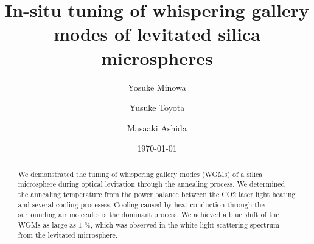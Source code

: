 \documentclass[aps,prl,preprint,groupedaddress]{revtex4-1}
\begin{document}

\title{In-situ tuning of whispering gallery modes of levitated silica microspheres}


\author{Yosuke Minowa}
\author{Yusuke Toyota}
\author{Masaaki Ashida}


\date{\today}

\begin{abstract}
We demonstrated the tuning of whispering gallery modes (WGMs) of a silica microsphere during optical levitation through the annealing process. We determined the annealing temperature from the power balance between the CO2 laser light heating and several cooling processes. Cooling caused by heat conduction through the surrounding air molecules is the dominant process. We achieved a blue shift of the WGMs as large as 1 \%, which was observed in the white-light scattering spectrum from the levitated microsphere.
\end{abstract}


\end{document}
